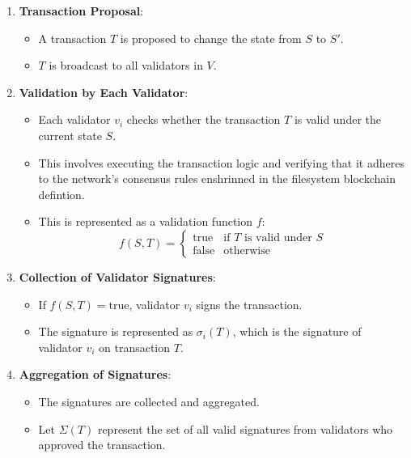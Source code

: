 \documentclass{tufte-handout}
\begin{document}
\begin{enumerate}
    \item \textbf{Transaction Proposal}:
    \begin{itemize}
        \item A transaction \( T \) is proposed to change the state from \( S \) to \( S' \).
        \item \( T \) is broadcast to all validators in \( V \).
    \end{itemize}

    \item \textbf{Validation by Each Validator}:
    \begin{itemize}
        \item Each validator \( v_i \) checks whether the transaction \( T \) is valid under the current state \( S \).
        \item This involves executing the transaction logic and verifying that it adheres to the network's consensus rules enshrinned
        in the filesystem blockchain defintion.
        \item This is represented as a validation function \( f \):
        \[
        f(S, T) = \begin{cases} 
        \text{true} & \text{if } T \text{ is valid under } S \\
        \text{false} & \text{otherwise}
        \end{cases}
        \]
    \end{itemize}

    \item \textbf{Collection of Validator Signatures}:
    \begin{itemize}
        \item If \( f(S, T) = \text{true} \), validator \( v_i \) signs the transaction.
        \item The signature is represented as \( \sigma_i(T) \), which is the signature of validator \( v_i \) on transaction \( T \).
    \end{itemize}

    \item \textbf{Aggregation of Signatures}:
    \begin{itemize}
        \item The signatures are collected and aggregated.
        \item Let \( \Sigma(T) \) represent the set of all valid signatures from validators who approved the transaction.
    \end{itemize}


\end{enumerate}
\end{document}
